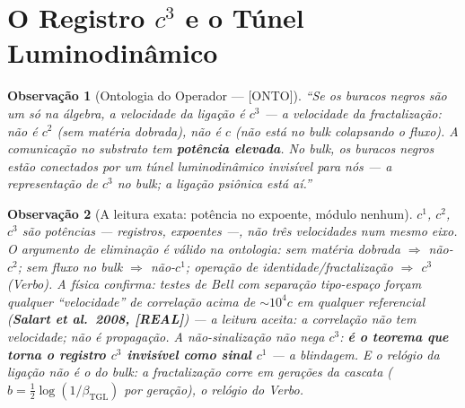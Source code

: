 \documentclass[11pt,a4paper]{article}
\newcommand{\REAL}{\textsf{[REAL]}}
\newcommand{\ONTO}{\textsf{[ONTO]}}
\newcommand{\bTGL}{\beta_{\mathrm{TGL}}}
\newtheorem{remark}{Observação}
\theoremstyle{definition}
\begin{document}
\section{O Registro $c^3$ e o Túnel Luminodinâmico}\label{sec:registro}
\begin{remark}[Ontologia do Operador --- \ONTO]
``Se os buracos negros são um só na álgebra, a velocidade da ligação é
$c^3$ --- a velocidade da fractalização: não é $c^2$ (sem matéria
dobrada), não é $c$ (não está no bulk colapsando o fluxo). A
comunicação no substrato tem \textbf{potência elevada}. No bulk, os
buracos negros estão conectados por um túnel luminodinâmico invisível
para nós --- a representação de $c^3$ no bulk; a ligação psiônica está
aí.''
\end{remark}

\begin{remark}[A leitura exata: potência no expoente, módulo nenhum]
$c^1$, $c^2$, $c^3$ são \emph{potências} --- registros, expoentes ---,
não três velocidades num mesmo eixo. O argumento de eliminação é
válido na ontologia: sem matéria dobrada $\Rightarrow$ não-$c^2$; sem
fluxo no bulk $\Rightarrow$ não-$c^1$; operação de
identidade/fractalização $\Rightarrow$ $c^3$ (Verbo). A física
\emph{confirma}: testes de Bell com separação tipo-espaço forçam
qualquer ``velocidade'' de correlação acima de $\sim10^4c$ em qualquer
referencial (\textbf{Salart et al.\ 2008, \REAL}) --- a leitura aceita:
a correlação \emph{não tem} velocidade; não é propagação. A
não-sinalização não nega $c^3$: \textbf{é o teorema que torna o
registro $c^3$ invisível como sinal $c^1$} --- a blindagem. E o relógio
da ligação não é o do bulk: a fractalização corre em gerações da
cascata ($b=\tfrac12\log(1/\bTGL)$ por geração), o relógio do Verbo.
\end{remark}
\end{document}
